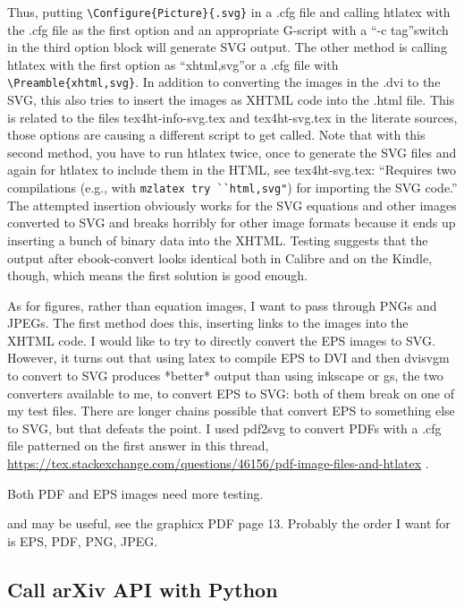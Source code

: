 \documentclass[12pt]{article}
\begin{document}
Thus, putting \verb+\Configure{Picture}{.svg}+ in a .cfg file and calling
htlatex with the .cfg file as the first option and an appropriate
G-script with a ``-c tag''switch in the third option block will
generate SVG output.  The other method is calling htlatex with the
first option as ``xhtml,svg''or a .cfg file with
\verb+\Preamble{xhtml,svg}+.  In addition to converting the images in the
.dvi to the SVG, this also tries to insert the images as XHTML code
into the .html file.  This is related to the files tex4ht-info-svg.tex
and tex4ht-svg.tex in the literate sources, those options are causing
a different script to get called.  Note that with this second method,
you have to run htlatex twice, once to generate the SVG files and
again for htlatex to include them in the HTML, see tex4ht-svg.tex:
``Requires two compilations (e.g., with \verb!mzlatex try ``html,svg"!)
for importing the SVG code.'' The attempted insertion obviously works
for the SVG equations and other images converted to SVG and breaks
horribly for other image formats because it ends up inserting a bunch
of binary data into the XHTML.  Testing suggests that the output after
ebook-convert looks identical both in Calibre and on the Kindle,
though, which means the first solution is good enough.

As for figures, rather than equation images, I want to pass through
PNGs and JPEGs.  The first method does this, inserting links to the
images into the XHTML code.  I would like to try to directly convert
the EPS images to SVG.  However, it turns out that using latex to
compile EPS to DVI and then dvisvgm to convert to SVG produces
*better* output than using inkscape or gs, the two converters
available to me, to convert EPS to SVG: both of them break on one of
my test files.  There are longer chains possible that convert EPS to
something else to SVG, but that defeats the point.  I used pdf2svg to
convert PDFs with a .cfg file patterned on the first answer in this
thread,
\url{https://tex.stackexchange.com/questions/46156/pdf-image-files-and-htlatex}
.

Both PDF and EPS images need more testing.

\DeclareGraphicsExtensions and \DeclareGraphicsRule may be useful, see
the graphicx PDF page 13.  Probably the order I want for
\DeclareGraphicsExtension is EPS, PDF, PNG, JPEG.


\subsection{Call arXiv API with Python}
\label{sec:call_arxiv_api}
\end{document}
